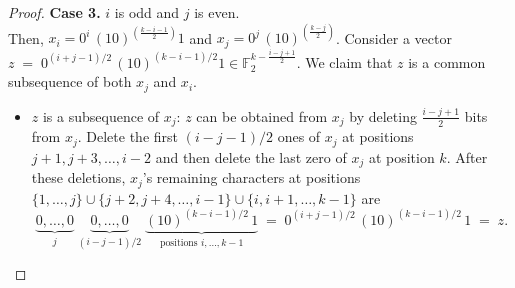 \documentclass[11 pt]{article}
\numberwithin{equation}{section}
\begin{document}
\begin{proof}
        
        




    \noindent\textbf{Case 3.} $i$ is odd and $j$ is even.\\
    Then, $x_i = 0^i\,(10)^{(\frac{k-i-1}{2})}1$ and $x_j = 0^j\,(10)^{(\frac{k-j}{2})}$.
    Consider a vector $z \;=\; 0^{(i+j-1)/2}\,(10)^{(k-i-1)/2}1 \in \mathbb{F}_2^{k - \frac{i-j+1}{2}}$. We claim that $z$ is a common subsequence of both $x_j$ and $x_i$.
    
    \medskip
    \begin{itemize}
    \item {$z$ is a subsequence of $x_j$:}      
     $z$ can be obtained from $x_j$ by deleting $\frac{i-j+1}{2}$ bits from $x_j$. Delete the first $(i - j - 1)/2$ ones of $x_j$ at positions $j+1, j+3, \ldots, i-2$ and then delete the last zero of $x_j$ at position $k$. After these deletions, $x_j$'s remaining characters at positions $\{1, \ldots, j\} \cup \{j+2, j+4, \ldots, i-1\} \cup \{i, i+1, \ldots, k-1\}$ are
    \[
    \underbrace{0, \ldots, 0}_{j}\;\underbrace{0, \ldots, 0}_{(i-j-1)/2}\;\underbrace{(10)^{(k-i-1)/2}\,1}_{\text{positions } i, \ldots, k-1}
    \;=\; 0^{(i+j-1)/2}\,(10)^{(k-i-1)/2}\,1 \;=\; z.
    \] 


\end{itemize}
\end{proof}
\end{document}
